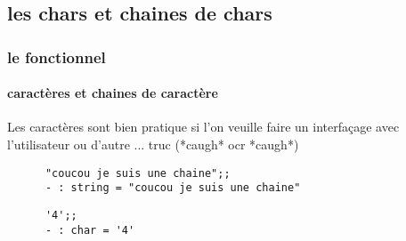   \subsection{les chars et chaines de chars}
\begin{frame}[fragile]
    \frametitle{le fonctionnel}
    \framesubtitle{caractères et chaines de caractère}
    Les caractères sont bien pratique si l'on veuille faire un interfaçage avec l'utilisateur ou d'autre ... truc (*caugh* ocr *caugh*)\\
    \begin{minipage}[t]{10cm}
      \begin{lstlisting}
      "coucou je suis une chaine";;
      - : string = "coucou je suis une chaine"
      \end{lstlisting}
    \end{minipage}
    \begin{minipage}[t]{5cm}
      \begin{lstlisting}
      '4';;
      - : char = '4'
      \end{lstlisting}
    \end{minipage}
\end{frame}
